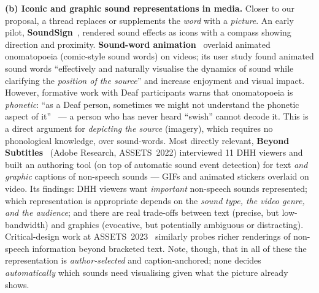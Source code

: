 \documentclass[11pt,a4paper]{article}
\begin{document}
\medskip\noindent\textbf{(b) Iconic and graphic sound representations in media.} Closer to our
proposal, a thread replaces or supplements the \emph{word} with a \emph{picture}. An early pilot,
\textbf{SoundSign}~\cite{soundsign}, rendered sound effects as icons with a compass showing
direction and proximity. \textbf{Sound-word animation}~\cite{soundwords} overlaid animated
onomatopoeia (comic-style sound words) on videos; its user study found animated sound words
``effectively and naturally visualise the dynamics of sound while clarifying the \emph{position of the
source}'' and increase enjoyment and visual impact. However, formative work with Deaf participants
warns that onomatopoeia is \emph{phonetic}: ``as a Deaf person, sometimes we might not understand the
phonetic aspect of it''~\cite{captune} --- a person who has never heard ``swish'' cannot decode it.
This is a direct argument for \emph{depicting the source} (imagery), which requires no phonological
knowledge, over sound-words. Most directly relevant, \textbf{Beyond Subtitles}~\cite{beyondsubtitles}
(Adobe Research, ASSETS~2022) interviewed 11 DHH viewers and built an authoring tool (on top of
automatic sound event detection) for text \emph{and graphic} captions of non-speech sounds --- GIFs
and animated stickers overlaid on video. Its findings: DHH viewers want \emph{important} non-speech
sounds represented; which representation is appropriate depends on the \emph{sound type, the video
genre, and the audience}; and there are real trade-offs between text (precise, but low-bandwidth) and
graphics (evocative, but potentially ambiguous or distracting). Critical-design work at
ASSETS~2023~\cite{nsicritical} similarly probes richer renderings of non-speech information beyond
bracketed text. Note, though, that in all of these the representation is \emph{author-selected} and
caption-anchored; none decides \emph{automatically} which sounds need visualising given what the
picture already shows.
\end{document}
